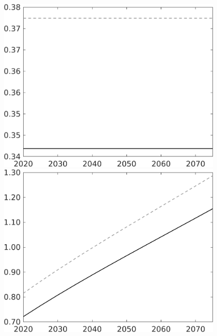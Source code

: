 \begin{figure}[h!!]
\begin{minipage}[]{0.32\textwidth}
	\end{minipage}	
	\begin{minipage}[]{0.32\textwidth}
		\includegraphics[width=1\textwidth]{../../codding_model/own_basedOnFried/optimalPol_010922_revision/figures/all_13Sept22/CompTaul_Equlab_LFBAU_Reg0_hh_spillover0_nsk1_xgr1_knspil1_sep1_countec0_GovRev1_etaa0.79_lgd0.png}
	\end{minipage}	
	\begin{minipage}[]{0.32\textwidth}
		\includegraphics[width=1\textwidth]{../../codding_model/own_basedOnFried/optimalPol_010922_revision/figures/all_13Sept22/CompTaul_Equlab_LFBAU_Reg0_C_spillover0_nsk1_xgr1_knspil1_sep1_countec0_GovRev1_etaa0.79_lgd0.png}

\end{minipage}
\end{figure}
